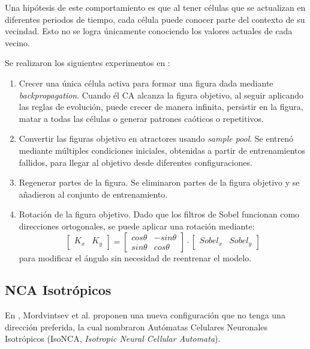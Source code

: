Una hipótesis de este comportamiento es que al tener células que se actualizan en diferentes periodos de tiempo, cada célula puede conocer parte del contexto de su vecindad. Esto no se logra únicamente conociendo los valores actuales de cada vecino.

Se realizaron los siguientes experimentos en \cite{mordvintsevNCA}:
\begin{enumerate}
	\item Crecer una única célula activa para formar una figura dada mediante \textit{backpropagation}. Cuando él CA alcanza la figura objetivo, al seguir aplicando las reglas de evolución, puede crecer de manera infinita, persistir en la figura, matar a todas las células o generar patrones caóticos o repetitivos.
	
	\item Convertir las figuras objetivo en atractores usando \textit{sample pool}. Se entrenó mediante múltiples condiciones iniciales, obtenidas a partir de entrenamientos fallidos, para llegar al objetivo desde diferentes configuraciones. 
	
	\item Regenerar partes de la figura. Se eliminaron partes de la figura objetivo y se añadieron al conjunto de entrenamiento.
	
	\item Rotación de la figura objetivo. Dado que los filtros de Sobel funcionan como direcciones ortogonales, se puede aplicar una rotación mediante: 
	\[ \begin{bmatrix}
		K_x & K_y
	\end{bmatrix} = \begin{bmatrix}
		cos \theta & -sin \theta \\
		sin \theta & cos \theta
	\end{bmatrix} \cdot \begin{bmatrix}
		Sobel_x & Sobel_y
	\end{bmatrix} \]
	para modificar el ángulo sin necesidad de reentrenar el modelo.
\end{enumerate}

\subsection{NCA Isotrópicos}

En \cite{IsoNCA} \cite{IsoNCA2} \cite{SteerableNCA}, Mordvintsev et al. proponen una nueva configuración que no tenga una dirección preferida, la cual nombraron Autómatas Celulares Neuronales Isotrópicos (IsoNCA, \textit{Isotropic Neural Cellular Automata}).

